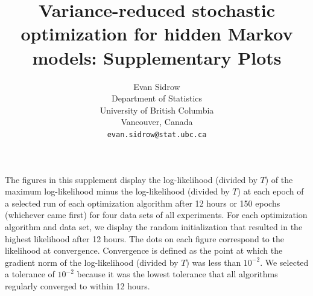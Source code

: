 \documentclass{article}
\title{Variance-reduced stochastic optimization for hidden Markov models: Supplementary Plots}
\author{
  Evan Sidrow \\
  Department of Statistics\\
  University of British Columbia\\
  Vancouver, Canada \\
  \texttt{evan.sidrow@stat.ubc.ca} \\
}
\begin{document}
\maketitle

The figures in this supplement display the log-likelihood (divided by $T$) of the maximum log-likelihood minus the log-likelihood (divided by $T$) at each epoch of a selected run of each optimization algorithm after 12 hours or 150 epochs (whichever came first) for four data sets of all experiments. For each optimization algorithm and data set, we display the random initialization that resulted in the highest likelihood after 12 hours. The dots on each figure correspond to the likelihood at convergence. Convergence is defined as the point at which the gradient norm of the log-likelihood (divided by $T$) was less than $10^{-2}$. We selected a tolerance of $10^{-2}$ because it was the lowest tolerance that all algorithms regularly converged to within 12 hours. 

\newpage
\end{document}
